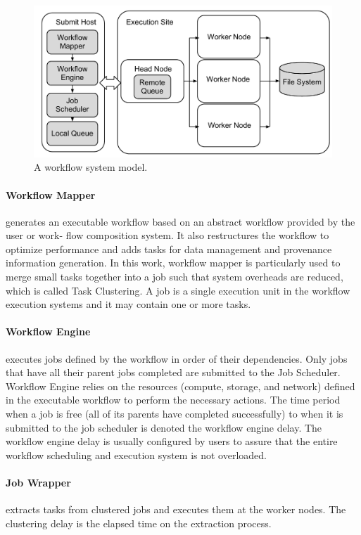 \begin{figure}[htb]
\centering
  \includegraphics[width=0.95\linewidth]{figure/execution.pdf}
  \caption{A workflow system model.}
  \label{fig:system}
  \vspace{-10pt}
\end{figure}

\paragraph{Workflow Mapper} generates an executable workflow based on an abstract workflow provided by the user or work- flow composition system. It also restructures the workflow to optimize performance and adds tasks for data management and provenance information generation. In this work, workflow mapper is particularly used to merge small tasks together into a job such that system overheads are reduced, which is called Task Clustering. A job is a single execution unit in the workflow execution systems and it may contain one or more tasks.

\paragraph{Workflow Engine} executes jobs defined by the workflow in order of their dependencies. Only jobs that have all their parent jobs completed are submitted to the Job Scheduler. Workflow Engine relies on the resources (compute, storage, and network) defined in the executable workflow to perform the necessary actions. The time period when a job is free (all of its parents have completed successfully) to when it is submitted to the job scheduler is denoted the workflow engine delay. The workflow engine delay is usually configured by users to assure that the entire workflow scheduling and execution system is not overloaded. 

\paragraph{Job Wrapper} extracts tasks from clustered jobs and executes them at the worker nodes. The clustering delay is the elapsed time on the extraction process.



